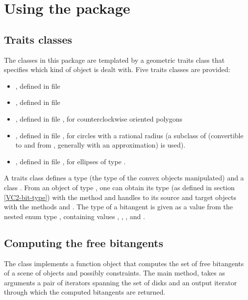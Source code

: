 \section{Using the package}

\subsection{Traits classes}
The classes in this package are templated by a geometric traits class that
specifies which kind of object is dealt with. Five traits classes are
provided:
\begin{itemize}
\item {}, defined in
file 
\item {}, defined in
file 
\item {}, defined in
file , for counterclockwise
oriented polygons
\item {}, defined in file
, for circles with a
rational radius (a subclass of  (convertible to and from
, generally with an approximation) is used).
\item {}, defined in file
, for ellipses of type
.
\end{itemize}

A traits class defines a type  (the type of the convex objects
manipulated) and a class . From an object of type
, one can obtain its type (as defined in section
\ref{VC2-bit-type}) with the method  and handles to its source
and target objects with the methods  and
. The type of a bitangent is given as a value from the
nested enum type , containing values ,
, , and .

\subsection{Computing the free bitangents}
The class  implements a
function object that computes the set of free bitangents of a scene of
objects and possibly constraints. The main method,  takes
as arguments a pair of iterators spanning the set of disks and an output
iterator through which the computed bitangents are returned.


